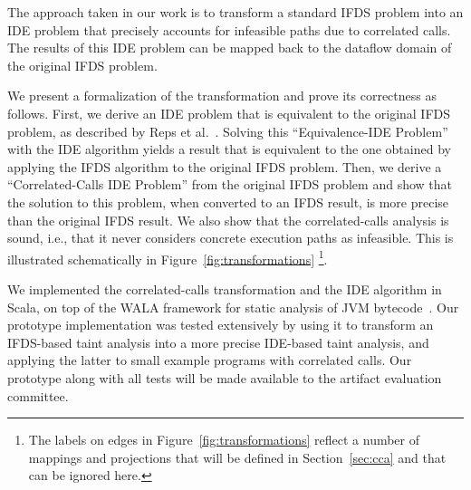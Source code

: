 

The approach taken in our work is to transform a standard IFDS problem into an
IDE problem that precisely accounts for infeasible paths due to correlated calls. 
The results of this IDE problem can be mapped back to the dataflow domain of the 
original IFDS problem.

We present a formalization of the transformation and prove its correctness
as follows. 
First, we derive an IDE problem that is equivalent to the original IFDS problem,
as described by Reps et al.~\cite{sagiv1996precise}.
Solving this ``Equivalence-IDE Problem'' with the IDE algorithm yields a result that
is equivalent to the one obtained by applying the IFDS algorithm to the original IFDS problem.
Then, we derive a ``Correlated-Calls 
IDE Problem'' from the original IFDS problem and show 
that the solution to this problem, when converted to an IFDS result, is more precise
than the original IFDS result.
We also show that the correlated-calls analysis is sound, i.e., that it never considers concrete execution paths as infeasible.
This is illustrated schematically
in Figure~\ref{fig:transformations}%
\footnote{ 
  The labels %
  on edges in 
  Figure~\ref{fig:transformations} reflect a number of mappings and projections 
  that will be defined in Section~\ref{sec:cca} and that can be ignored here.
}.

We implemented the correlated-calls transformation and the IDE algorithm in Scala,
on top of the WALA framework for static analysis of JVM bytecode~\cite{fink2012wala}.
Our prototype implementation was tested extensively by using it to transform an IFDS-based 
taint analysis into a more precise IDE-based taint analysis, and applying the latter
to small example programs with correlated calls. Our prototype along with all tests
will be made available to the artifact evaluation committee.

%

